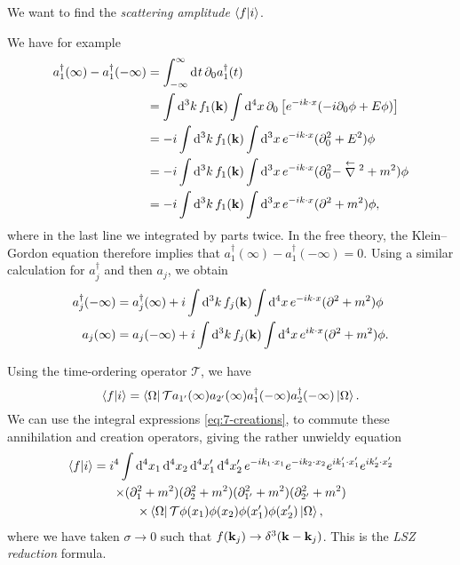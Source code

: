 We want to find the \emph{scattering amplitude} $\bra{f}\ket{i}$.
\begin{remark}
  We have for example
  \begin{align}
    a_1^{\dagger}(\infty) - a_1^{\dagger}(-\infty) &= \int_{-\infty}^{\infty}\dd[]{t} \partial_0 a_1^{\dagger} (t) \\
					     &= \int \dd[3]{k} f_1(\vb{k}) \int \dd[4]{x} \partial_0 \left[ e^{-i k \cdot x} (-i \partial_0 \phi + E \phi) \right] \\
					     &= -i \int \dd[3]{k} f_1(\vb{k}) \int \dd[3]{x} e^{-i k \cdot x} (\partial_0^2 + E^2) \phi \\
					     &= -i \int \dd[3]{k} f_1(\vb{k}) \int \dd[3]{x} e^{-i k \cdot x} (\partial_0^2 - \stackrel{\leftarrow}{\nabla}{}^2 + m^2) \phi \\
					     &= -i \int \dd[3]{k} f_1(\vb{k}) \int \dd[3]{x} e^{-i k \cdot x} (\partial^2 + m^2) \phi,
  \end{align}
  where in the last line we integrated by parts twice.
  In the free theory, the Klein--Gordon equation therefore implies that $a_1^{\dagger}(\infty) - a_1^{\dagger}(-\infty) = 0$.
  Using a similar calculation for $a^{\dagger}_j$ and then $a_j$, we obtain
  \begin{subequations}
    \label{eq:7-creations}
     \begin{align}
       a_j^{\dagger}(-\infty) &= a_j^{\dagger}(\infty) + i \int \dd[3]{k} f_j(\vb{k}) \int \dd[4]{x} e^{-i k \cdot x} (\partial^2 + m^2) \phi \\
       a_j(\infty) &= a_j(-\infty) + i \int \dd[3]{k} f_j(\vb{k}) \int \dd[4]{x} e^{i k \cdot x} (\partial^2 + m^2) \phi.
    \end{align}
  \end{subequations}
\end{remark}
Using the time-ordering operator $\mathcal{T}$, we have
\begin{equation}
  \bra{f}\ket{i} = \bra{\Omega} \mathcal{T} a_{1'}(\infty) a_{2'}(\infty)a_{1}^{\dagger}(-\infty) a_2^{\dagger}(-\infty) \ket{\Omega}.
\end{equation}
We can use the integral expressions \eqref{eq:7-creations}, to commute these annihilation and creation operators, giving the rather unwieldy equation
\begin{multline}
  \label{eq:lsz}
  \bra{f}\ket{i} = i^4 \int \dd[4]{x_1} \dd[4]{x_2} \dd[4]{x_1'}\dd[4]{x_2'} e^{-i k_1 \cdot x_1} e^{-i k_2 \cdot x_2} e^{i k_1' \cdot x_1'} e^{i k_2' \cdot x_2'} \\
   \times (\partial_1^2 + m^2) (\partial^2_2 + m^2) (\partial_{1'}^2 + m^2) (\partial_{2'}^2 + m^2) \\
   \times \bra{\Omega} \mathcal{T} \phi(x_1) \phi(x_2) \phi(x_1') \phi(x_2') \ket{\Omega},
\end{multline}
where we have taken $\sigma \to 0$ such that $f(\vb{k}_j) \to \delta^3 (\vb{k} - \vb{k}_j)$.
This is the \emph{LSZ reduction} formula.

